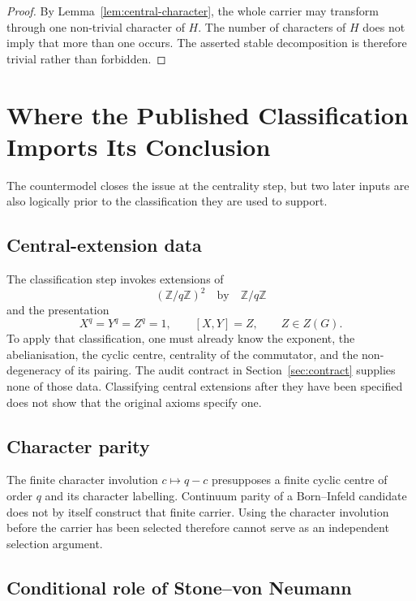 \documentclass[11pt,a4paper]{article}
\begin{document}
\begin{proof}
By Lemma~\ref{lem:central-character}, the whole carrier may transform through one non-trivial character of
\(H\).
The number of characters of \(H\) does not imply that more than one occurs.
The asserted stable decomposition is therefore trivial rather than forbidden.
\end{proof}

\section{Where the Published Classification Imports Its Conclusion}
\label{sec:classification}

The countermodel closes the issue at the centrality step, but two later inputs are also logically prior to
the classification they are used to support.

\subsection{Central-extension data}

The classification step invokes extensions of
\[
(\mathbb{Z}/q\mathbb{Z})^2
\quad\text{by}\quad
\mathbb{Z}/q\mathbb{Z}
\]
and the presentation
\[
X^q=Y^q=Z^q=1,\qquad [X,Y]=Z,\qquad Z\in Z(G).
\]
To apply that classification, one must already know the exponent, the abelianisation, the cyclic centre,
centrality of the commutator, and the non-degeneracy of its pairing.
The audit contract in Section~\ref{sec:contract} supplies none of those data.
Classifying central extensions after they have been specified does not show that the original axioms specify
one.

\subsection{Character parity}

The finite character involution \(c\mapsto q-c\) presupposes a finite cyclic centre of order \(q\) and its
character labelling.
Continuum parity of a Born--Infeld candidate does not by itself construct that finite carrier.
Using the character involution before the carrier has been selected therefore cannot serve as an independent
selection argument.

\subsection{Conditional role of Stone--von Neumann}
\end{document}
